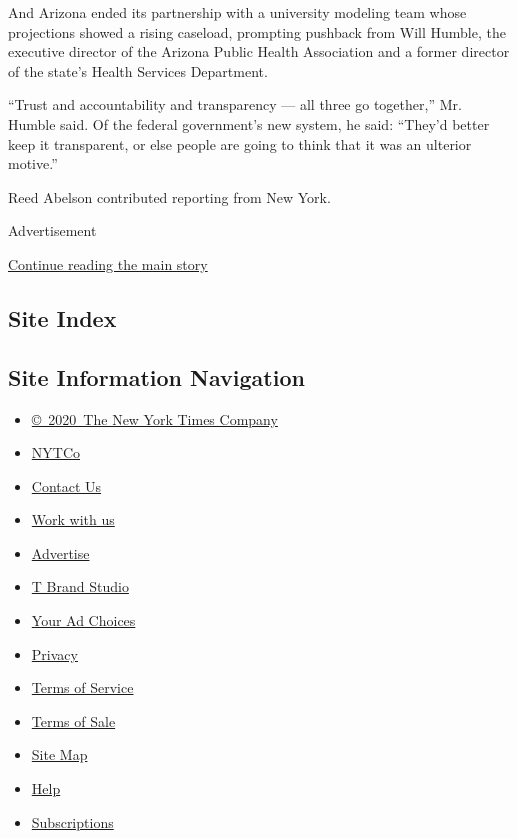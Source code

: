 And Arizona ended its partnership with a university modeling team whose
projections showed a rising caseload, prompting pushback from Will
Humble, the executive director of the Arizona Public Health Association
and a former director of the state's Health Services Department.

``Trust and accountability and transparency --- all three go together,''
Mr. Humble said. Of the federal government's new system, he said:
``They'd better keep it transparent, or else people are going to think
that it was an ulterior motive.''

Reed Abelson contributed reporting from New York.

Advertisement

\protect\hyperlink{after-bottom}{Continue reading the main story}

\hypertarget{site-index}{%
\subsection{Site Index}\label{site-index}}

\hypertarget{site-information-navigation}{%
\subsection{Site Information
Navigation}\label{site-information-navigation}}

\begin{itemize}
\tightlist
\item
  \href{https://help.nytimes3xbfgragh.onion/hc/en-us/articles/115014792127-Copyright-notice}{©~2020~The
  New York Times Company}
\end{itemize}

\begin{itemize}
\tightlist
\item
  \href{https://www.nytco.com/}{NYTCo}
\item
  \href{https://help.nytimes3xbfgragh.onion/hc/en-us/articles/115015385887-Contact-Us}{Contact
  Us}
\item
  \href{https://www.nytco.com/careers/}{Work with us}
\item
  \href{https://nytmediakit.com/}{Advertise}
\item
  \href{http://www.tbrandstudio.com/}{T Brand Studio}
\item
  \href{https://www.nytimes3xbfgragh.onion/privacy/cookie-policy\#how-do-i-manage-trackers}{Your
  Ad Choices}
\item
  \href{https://www.nytimes3xbfgragh.onion/privacy}{Privacy}
\item
  \href{https://help.nytimes3xbfgragh.onion/hc/en-us/articles/115014893428-Terms-of-service}{Terms
  of Service}
\item
  \href{https://help.nytimes3xbfgragh.onion/hc/en-us/articles/115014893968-Terms-of-sale}{Terms
  of Sale}
\item
  \href{https://spiderbites.nytimes3xbfgragh.onion}{Site Map}
\item
  \href{https://help.nytimes3xbfgragh.onion/hc/en-us}{Help}
\item
  \href{https://www.nytimes3xbfgragh.onion/subscription?campaignId=37WXW}{Subscriptions}
\end{itemize}
